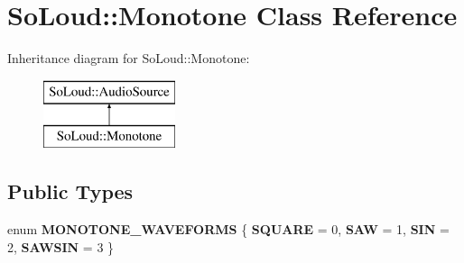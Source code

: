 \hypertarget{class_so_loud_1_1_monotone}{}\section{So\+Loud\+:\+:Monotone Class Reference}
\label{class_so_loud_1_1_monotone}
Inheritance diagram for So\+Loud\+:\+:Monotone\+:\begin{figure}[H]
\begin{center}
\leavevmode
\includegraphics[height=2.000000cm]{class_so_loud_1_1_monotone}
\end{center}
\end{figure}
\subsection*{Public Types}
\begin{DoxyCompactItemize}
\item 
\mbox{\label{class_so_loud_1_1_monotone_ae32e37d4bd95aab51d6eb5d293b3c3f3}} 
enum {\bfseries M\+O\+N\+O\+T\+O\+N\+E\+\_\+\+W\+A\+V\+E\+F\+O\+R\+MS} \{ {\bfseries S\+Q\+U\+A\+RE} = 0, 
{\bfseries S\+AW} = 1, 
{\bfseries S\+IN} = 2, 
{\bfseries S\+A\+W\+S\+IN} = 3
 \}
\end{DoxyCompactItemize}
